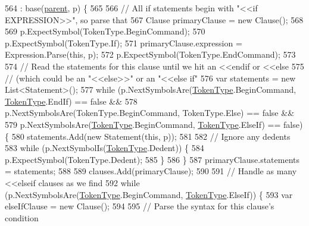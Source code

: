 \begin{DoxyCode}
564                                                              : base(\hyperlink{a00142_af313a82103fcc2ff5a177dbb06b92f7b}{parent}, p) \{
565 
566                 \textcolor{comment}{// All if statements begin with "<<if EXPRESSION>>", so parse that}
567                 Clause primaryClause = \textcolor{keyword}{new} Clause();
568 
569                 p.ExpectSymbol(TokenType.BeginCommand);
570                 p.ExpectSymbol(TokenType.If);
571                 primaryClause.expression = Expression.Parse(\textcolor{keyword}{this}, p);
572                 p.ExpectSymbol(TokenType.EndCommand);
573 
574                 \textcolor{comment}{// Read the statements for this clause until  we hit an <<endif or <<else}
575                 \textcolor{comment}{// (which could be an "<<else>>" or an "<<else if"}
576                 var statements = \textcolor{keyword}{new} List<Statement>();
577                 \textcolor{keywordflow}{while} (p.NextSymbolsAre(\hyperlink{a00045_a301aa7c866593a5b625a8fc158bbeace}{TokenType}.BeginCommand, 
      \hyperlink{a00045_a301aa7c866593a5b625a8fc158bbeace}{TokenType}.EndIf) == \textcolor{keyword}{false} &&
578                     p.NextSymbolsAre(TokenType.BeginCommand, TokenType.Else) == \textcolor{keyword}{false} &&
579                     p.NextSymbolsAre(\hyperlink{a00045_a301aa7c866593a5b625a8fc158bbeace}{TokenType}.BeginCommand, \hyperlink{a00045_a301aa7c866593a5b625a8fc158bbeace}{TokenType}.ElseIf) == \textcolor{keyword}{false}) 
      \{
580                     statements.Add(\textcolor{keyword}{new} Statement(\textcolor{keyword}{this}, p));
581 
582                     \textcolor{comment}{// Ignore any dedents}
583                     \textcolor{keywordflow}{while} (p.NextSymbolIs(\hyperlink{a00045_a301aa7c866593a5b625a8fc158bbeace}{TokenType}.Dedent)) \{
584                         p.ExpectSymbol(TokenType.Dedent);
585                     \}
586                 \}
587                 primaryClause.statements = statements;
588 
589                 clauses.Add(primaryClause);
590 
591                 \textcolor{comment}{// Handle as many <<elseif clauses as we find}
592                 \textcolor{keywordflow}{while} (p.NextSymbolsAre(\hyperlink{a00045_a301aa7c866593a5b625a8fc158bbeace}{TokenType}.BeginCommand, 
      \hyperlink{a00045_a301aa7c866593a5b625a8fc158bbeace}{TokenType}.ElseIf)) \{
593                     var elseIfClause = \textcolor{keyword}{new} Clause();
594 
595                     \textcolor{comment}{// Parse the syntax for this clause's condition}

\end{DoxyCode}
